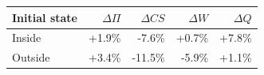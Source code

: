 \begin{tabular}{lrrrr}\toprule
Initial state & $\Delta\Pi$ & $\Delta CS$ & $\Delta W$ & $\Delta Q$\\\midrule
Inside & +1.9\% & -7.6\% & +0.7\% & +7.8\% \\
Outside & +3.4\% & -11.5\% & -5.9\% & +1.1\% \\
\bottomrule\end{tabular}
